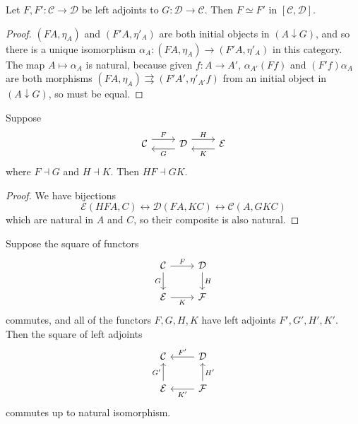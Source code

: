 \begin{corollary}
    Let \( F, F' : \mathcal C \to \mathcal D \) be left adjoints to \( G : \mathcal D \to \mathcal C \).
    Then \( F \simeq F' \) in \( [\mathcal C, \mathcal D] \).
\end{corollary}
\begin{proof}
    \( (FA, \eta_A) \) and \( (F'A, \eta'_A) \) are both initial objects in \( (A \downarrow G) \), and so there is a unique isomorphism \( \alpha_A : (FA, \eta_A) \to (F'A, \eta'_A) \) in this category.
    The map \( A \mapsto \alpha_A \) is natural, because given \( f : A \to A' \), \( \alpha_{A'}(Ff) \) and \( (F'f) \alpha_A \) are both morphisms \( (FA, \eta_A) \rightrightarrows (F'A', \eta'_{A'} f) \) from an initial object in \( (A \downarrow G) \), so must be equal.
\end{proof}
\begin{lemma}
    Suppose
\[\begin{tikzcd}
	{\mathcal C} & {\mathcal D} & {\mathcal E}
	\arrow["F", shift left=2, from=1-1, to=1-2]
	\arrow["H", shift left=2, from=1-2, to=1-3]
	\arrow["K", shift left=2, from=1-3, to=1-2]
	\arrow["G", shift left=2, from=1-2, to=1-1]
\end{tikzcd}\]
    where \( F \dashv G \) and \( H \dashv K \).
    Then \( HF \dashv GK \).
\end{lemma}
\begin{proof}
    We have bijections
    \[ \mathcal E(HFA, C) \leftrightarrow \mathcal D(FA, KC) \leftrightarrow \mathcal C(A, GKC) \]
    which are natural in \( A \) and \( C \), so their composite is also natural.
\end{proof}
\begin{corollary}
    Suppose the square of functors
\[\begin{tikzcd}
	{\mathcal C} & {\mathcal D} \\
	{\mathcal E} & {\mathcal F}
	\arrow["F", from=1-1, to=1-2]
	\arrow["H", from=1-2, to=2-2]
	\arrow["G"', from=1-1, to=2-1]
	\arrow["K"', from=2-1, to=2-2]
\end{tikzcd}\]
    commutes, and all of the functors \( F, G, H, K \) have left adjoints \( F', G', H', K' \).
    Then the square of left adjoints
\[\begin{tikzcd}
	{\mathcal C} & {\mathcal D} \\
	{\mathcal E} & {\mathcal F}
	\arrow["{F'}"', from=1-2, to=1-1]
	\arrow["{H'}"', from=2-2, to=1-2]
	\arrow["{G'}", from=2-1, to=1-1]
	\arrow["{K'}", from=2-2, to=2-1]
\end{tikzcd}\]
    commutes up to natural isomorphism.
\end{corollary}

